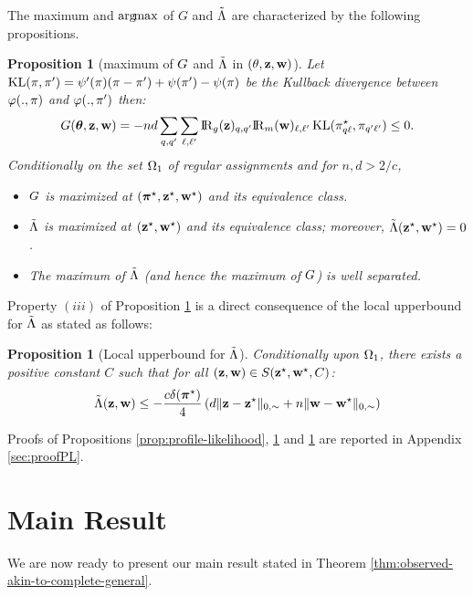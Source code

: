 \documentclass[bj]{imsart}
\numberwithin{equation}{section}
\theoremstyle{plain}
\newtheorem{proposition}[thm]{Proposition}
\theoremstyle{remark}
\begin{document}
The maximum and $\operatorname*{arg\!max}$ of $G$ and $\tilde{\Lambda}$ are characterized by the following propositions.
\begin{proposition}[maximum of $G$ and $\tilde{\Lambda}$ in $(\theta,\mathbf{z},\mathbf{w})$]
  \label{prop:maximum-conditional-likelihood}
  Let $\operatorname{KL}(\pi,\pi') = \psi'(\pi) (\pi - \pi') + \psi(\pi') - \psi(\pi)$ be the Kullback divergence between $\varphi(., \pi)$ and $\varphi(., \pi')$ then:
  \begin{equation}
    \label{eq:conditional-likelihood-second-form}
    \G(\btheta, \bz, \bw) = - \n\dd \sum_{\kk,\kp} \sum_{\el,\lp} \Rgbz_{\kk,\kp} \Rmbw_{\el, \lp} \KL(\al^\vrai_{\kk\el}, \al_{\kp\lp}) \leq 0.
  \end{equation}
  Conditionally on the set $\Omega_1$ of regular assignments and for $n, d > 2/c$,
\begin{itemize}
\item[(i)] $G$ is maximized at $(\boldsymbol{\pi}^\star, \mathbf{z}^\star, \mathbf{w}^\star)$ and its equivalence class.
\item[(ii)] $\tilde{\Lambda}$ is maximized at $(\mathbf{z}^\star, \mathbf{w}^\star)$ and its equivalence class; moreover, $\tilde{\Lambda}(\mathbf{z}^\star, \mathbf{w}^\star)=0$.
\item[(iii)] The maximum of $\tilde{\Lambda}$ (and hence the maximum of $G$) is well separated.
\end{itemize}

\end{proposition}
Property $(iii)$ of Proposition \ref{prop:maximum-conditional-likelihood} is a direct consequence of the local upperbound for $\tilde{\Lambda}$ as stated as follows:

\begin{proposition}[Local upperbound for  $\tilde{\Lambda}$]
\label{prop:profile-likelihood-derivative}
Conditionally upon $\Omega_1$, there exists a positive constant $C$ such that for all $(\mathbf{z}, \mathbf{w}) \in S(\mathbf{z}^\star, \mathbf{w}^\star, C)$:
\begin{equation}
 \label{eq:conditional-likelihood-separability}
  \Lambtilde(\bz, \bw) \leq -\frac{c\delta(\bals)}{4} \left( \dd \|\bz - \bzs\|_{0, \sim} + \n \|\bw - \bws\|_{0,\sim} \right)
\end{equation}
\end{proposition}
Proofs of Propositions \ref{prop:profile-likelihood}, \ref{prop:maximum-conditional-likelihood} and \ref{prop:profile-likelihood-derivative} are reported in Appendix \ref{sec:proofPL}.

\section{Main Result}
\label{sec:big-theorem}
We are now ready to present our main result
 stated in Theorem \ref{thm:observed-akin-to-complete-general}.
\end{document}
